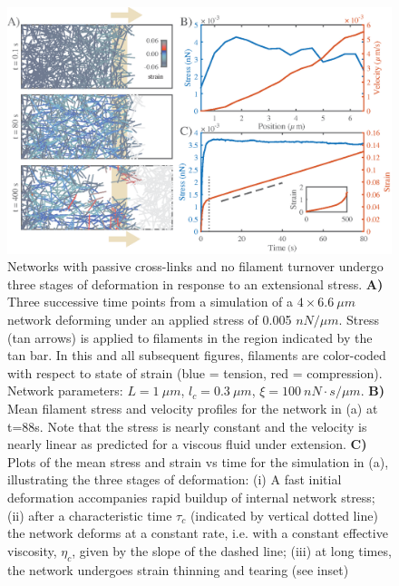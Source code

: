 \begin{figure}[H]
	\centering
	\includegraphics[width=\hsize]{active/figures/Fig2}
	\caption{\label{fig:passive_ex}  Networks with passive cross-links and no filament turnover undergo three stages of deformation in response to an extensional stress.   \textbf{A)} Three successive time points from a simulation of a $4\times6.6\: \mu m$ network deforming under an applied stress of 0.005 $nN/\mu m$. Stress (tan arrows) is applied to filaments in the region indicated by the tan bar. In this and all subsequent figures, filaments are color-coded with respect to state of strain (blue = tension, red = compression).  Network parameters: $L=1\: \mu m$, $l_c=0.3\: \mu m$, $\xi=100\: nN\cdot s/\mu m$. \textbf{B)} Mean filament stress and velocity profiles for the  network in (a) at t=88s. Note that the stress is nearly constant and the velocity is nearly linear as predicted for a viscous fluid under extension.  \textbf{C)} Plots of the mean stress and strain vs time for the simulation in (a), illustrating the three stages of deformation: (i) A fast initial deformation accompanies rapid buildup of internal network stress; (ii) after a characteristic time $\tau_c$ (indicated by vertical dotted line) the network deforms at a constant rate, i.e. with a constant effective viscosity, $\eta_c$, given by the slope of the dashed line; (iii) at long times, the network undergoes strain thinning and tearing (see inset)}
\end{figure}


